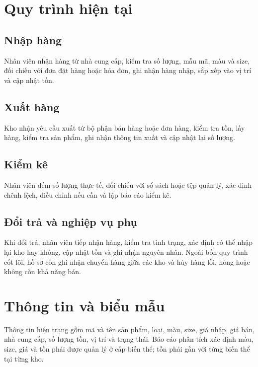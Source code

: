 \documentclass[12pt,a4paper]{report}
\begin{document}
\section{Quy trình hiện tại}

\subsection{Nhập hàng}
Nhân viên nhận hàng từ nhà cung cấp, kiểm tra số lượng, mẫu mã, màu và size, đối chiếu với đơn đặt hàng hoặc hóa đơn, ghi nhận hàng nhập, sắp xếp vào vị trí và cập nhật tồn.

\subsection{Xuất hàng}
Kho nhận yêu cầu xuất từ bộ phận bán hàng hoặc đơn hàng, kiểm tra tồn, lấy hàng, kiểm tra sản phẩm, ghi nhận thông tin xuất và cập nhật lại số lượng.

\subsection{Kiểm kê}
Nhân viên đếm số lượng thực tế, đối chiếu với sổ sách hoặc tệp quản lý, xác định chênh lệch, điều chỉnh nếu cần và lập báo cáo kiểm kê.

\subsection{Đổi trả và nghiệp vụ phụ}
Khi đổi trả, nhân viên tiếp nhận hàng, kiểm tra tình trạng, xác định có thể nhập lại kho hay không, cập nhật tồn và ghi nhận nguyên nhân. Ngoài bốn quy trình cốt lõi, hồ sơ còn ghi nhận chuyển hàng giữa các kho và hủy hàng lỗi, hỏng hoặc không còn khả năng bán.

\section{Thông tin và biểu mẫu}

Thông tin hiện trạng gồm mã và tên sản phẩm, loại, màu, size, giá nhập, giá bán, nhà cung cấp, số lượng tồn, vị trí và trạng thái. Báo cáo phân tích xác định màu, size, giá và tồn phải được quản lý ở cấp biến thể; tồn phải gắn với từng biến thể tại từng kho.
\end{document}
